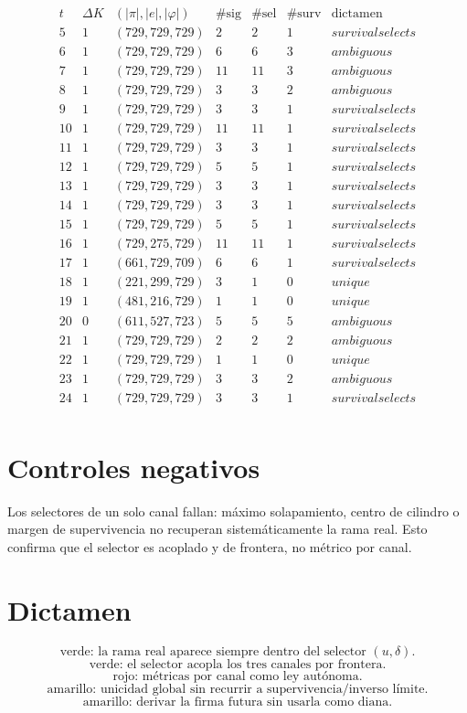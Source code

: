\documentclass[11pt,a4paper]{article}
\begin{document}
\[
\begin{array}{c|c|c|c|c|c|c}
t&\Delta K&(|\pi|,|e|,|\varphi|)&\#\text{sig}&\#\text{sel}&\#\text{surv}&\text{dictamen}\\
\hline
5 & 1 & (729,729,729) & 2 & 2 & 1 & survival selects \\
6 & 1 & (729,729,729) & 6 & 6 & 3 & ambiguous \\
7 & 1 & (729,729,729) & 11 & 11 & 3 & ambiguous \\
8 & 1 & (729,729,729) & 3 & 3 & 2 & ambiguous \\
9 & 1 & (729,729,729) & 3 & 3 & 1 & survival selects \\
10 & 1 & (729,729,729) & 11 & 11 & 1 & survival selects \\
11 & 1 & (729,729,729) & 3 & 3 & 1 & survival selects \\
12 & 1 & (729,729,729) & 5 & 5 & 1 & survival selects \\
13 & 1 & (729,729,729) & 3 & 3 & 1 & survival selects \\
14 & 1 & (729,729,729) & 3 & 3 & 1 & survival selects \\
15 & 1 & (729,729,729) & 5 & 5 & 1 & survival selects \\
16 & 1 & (729,275,729) & 11 & 11 & 1 & survival selects \\
17 & 1 & (661,729,709) & 6 & 6 & 1 & survival selects \\
18 & 1 & (221,299,729) & 3 & 1 & 0 & unique \\
19 & 1 & (481,216,729) & 1 & 1 & 0 & unique \\
20 & 0 & (611,527,723) & 5 & 5 & 5 & ambiguous \\
21 & 1 & (729,729,729) & 2 & 2 & 2 & ambiguous \\
22 & 1 & (729,729,729) & 1 & 1 & 0 & unique \\
23 & 1 & (729,729,729) & 3 & 3 & 2 & ambiguous \\
24 & 1 & (729,729,729) & 3 & 3 & 1 & survival selects \\
\end{array}
\]

\section{Controles negativos}

Los selectores de un solo canal fallan: máximo solapamiento, centro de cilindro o margen de supervivencia no recuperan sistemáticamente la rama real. Esto confirma que el selector es acoplado y de frontera, no métrico por canal.

\section{Dictamen}

\[
\boxed{
\text{verde: la rama real aparece siempre dentro del selector }(u,\delta).
}
\]
\[
\boxed{
\text{verde: el selector acopla los tres canales por frontera.}
}
\]
\[
\boxed{
\text{rojo: métricas por canal como ley autónoma.}
}
\]
\[
\boxed{
\text{amarillo: unicidad global sin recurrir a supervivencia/inverso límite.}
}
\]
\[
\boxed{
\text{amarillo: derivar la firma futura sin usarla como diana.}
}
\]
\end{document}

